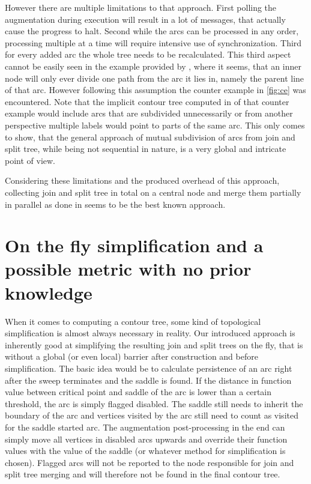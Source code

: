 \documentclass{scrartcl}
\begin{document}
However there are multiple limitations to that approach. First polling the augmentation during execution will result in a lot of messages, that actually cause the progress to halt. Second while the arcs can be processed in any order, processing multiple at a time will require intensive use of synchronization. Third for every added arc the whole tree needs to be recalculated. This third aspect cannot be easily seen in the example provided by \cite{chiang}, where it seems, that an inner node will only ever divide one path from the arc it lies in, namely the parent line of that arc. However following this assumption the counter example in \ref{fig:ce} was encountered. Note that the implicit contour tree computed in \cite{chiang} of that counter example would include arcs that are subdivided unnecessarily or from another perspective multiple labels would point to parts of the same arc. This only comes to show, that the general approach of mutual subdivision of arcs from join and split tree, while being not sequential in nature, is a very global and intricate point of view. 

Considering these limitations and the produced overhead of this approach, collecting join and split tree in total on a central node and merge them partially in parallel as done in \cite{Carr} seems to be the best known approach.


\section{On the fly simplification and a possible metric with no prior knowledge}

When it comes to computing a contour tree, some kind of topological simplification is almost always necessary in reality. Our introduced approach is inherently good at simplifying the resulting join and split trees on the fly, that is without a global (or even local) barrier after construction and before simplification. The basic idea would be to calculate persistence of an arc right after the sweep terminates and the saddle is found. If the distance in function value between critical point and saddle of the arc is lower than a certain threshold, the arc is simply flagged disabled. The saddle still needs to inherit the boundary of the arc and vertices visited by the arc still need to count as visited for the saddle started arc. The augmentation post-processing in the end can simply move all vertices in disabled arcs upwards and override their function values with the value of the saddle (or whatever method for simplification is chosen). Flagged arcs will not be reported to the node responsible for join and split tree merging and will therefore not be found in the final contour tree.
\end{document}
